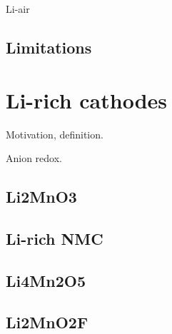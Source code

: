 Li-air

\subsection{Limitations}

\section{Li-rich cathodes}

Motivation, definition.

Anion redox. \cite{Yahia2019}


\subsection{Li2MnO3}

\subsection{Li-rich NMC}

\subsection{Li4Mn2O5}
\subsection{Li2MnO2F}




